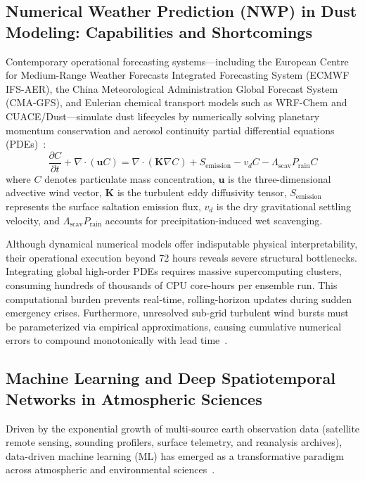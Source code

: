 \subsection{Numerical Weather Prediction (NWP) in Dust Modeling: Capabilities and Shortcomings}
\label{subsec:nwp_limits}

Contemporary operational forecasting systems—including the European Centre for Medium-Range Weather Forecasts Integrated Forecasting System (ECMWF IFS-AER), the China Meteorological Administration Global Forecast System (CMA-GFS), and Eulerian chemical transport models such as WRF-Chem and CUACE/Dust—simulate dust lifecycles by numerically solving planetary momentum conservation and aerosol continuity partial differential equations (PDEs)~\cite{ref2}:
\begin{equation}
\label{eq:aerosol_transport_intro}
\frac{\partial C}{\partial t} + \nabla \cdot (\mathbf{u} C) = \nabla \cdot (\mathbf{K} \nabla C) + S_{\text{emission}} - v_d C - \Lambda_{\text{scav}} P_{\text{rain}} C
\end{equation}
where $C$ denotes particulate mass concentration, $\mathbf{u}$ is the three-dimensional advective wind vector, $\mathbf{K}$ is the turbulent eddy diffusivity tensor, $S_{\text{emission}}$ represents the surface saltation emission flux, $v_d$ is the dry gravitational settling velocity, and $\Lambda_{\text{scav}} P_{\text{rain}}$ accounts for precipitation-induced wet scavenging.

Although dynamical numerical models offer indisputable physical interpretability, their operational execution beyond 72 hours reveals severe structural bottlenecks. Integrating global high-order PDEs requires massive supercomputing clusters, consuming hundreds of thousands of CPU core-hours per ensemble run. This computational burden prevents real-time, rolling-horizon updates during sudden emergency crises. Furthermore, unresolved sub-grid turbulent wind bursts must be parameterized via empirical approximations, causing cumulative numerical errors to compound monotonically with lead time~\cite{ref2,ref3}.

\subsection{Machine Learning and Deep Spatiotemporal Networks in Atmospheric Sciences}
\label{subsec:ml_weather_progress}

Driven by the exponential growth of multi-source earth observation data (satellite remote sensing, sounding profilers, surface telemetry, and reanalysis archives), data-driven machine learning (ML) has emerged as a transformative paradigm across atmospheric and environmental sciences~\cite{ref1,ref32,ref40}.

